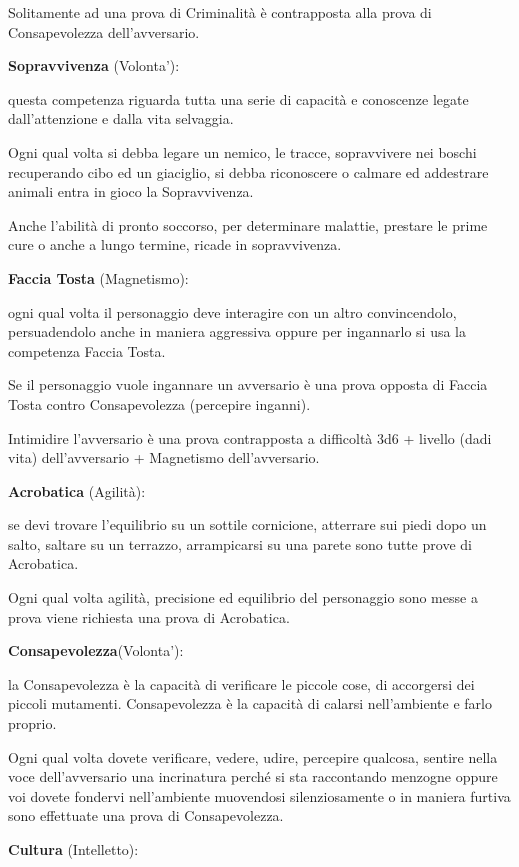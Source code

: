\documentclass[a4paper,11pt,twoside,openany]{book}
\begin{document}
Solitamente ad una prova di Criminalità è contrapposta alla prova di Consapevolezza dell'avversario.

\textbf{Sopravvivenza} (Volonta'):

questa competenza riguarda tutta una serie di capacità e conoscenze legate dall'attenzione e dalla vita selvaggia.

Ogni qual volta si debba legare un nemico, le tracce, sopravvivere nei boschi recuperando cibo ed un giaciglio,  si debba riconoscere o calmare ed addestrare animali entra in gioco la Sopravvivenza.

Anche l'abilità di pronto soccorso, per determinare malattie, prestare le prime cure o anche a lungo termine, ricade in sopravvivenza.

\textbf{Faccia Tosta} (Magnetismo):

ogni qual volta il personaggio deve interagire con un altro convincendolo, persuadendolo anche in maniera aggressiva oppure per ingannarlo si usa la competenza Faccia Tosta.

Se il personaggio vuole ingannare un avversario è una prova opposta di Faccia Tosta contro Consapevolezza (percepire inganni).

Intimidire l'avversario è una prova contrapposta a difficoltà 3d6 + livello (dadi vita) dell'avversario + Magnetismo dell'avversario.

\textbf{Acrobatica} (Agilità):

se devi trovare l'equilibrio su un sottile cornicione, atterrare sui piedi dopo un salto, saltare su un terrazzo, arrampicarsi su una parete sono tutte prove di Acrobatica.

Ogni qual volta agilità, precisione ed equilibrio del personaggio sono messe a prova viene richiesta una prova di Acrobatica.

\textbf{Consapevolezza}(Volonta'):

la Consapevolezza è la capacità di verificare le piccole cose, di accorgersi dei piccoli mutamenti. Consapevolezza è la capacità di calarsi nell'ambiente e farlo proprio.

Ogni qual volta dovete verificare, vedere, udire, percepire qualcosa, sentire nella voce dell'avversario una incrinatura perché si sta raccontando menzogne oppure voi dovete fondervi nell'ambiente muovendosi silenziosamente o in maniera furtiva sono effettuate una prova di Consapevolezza.

\textbf{Cultura} (Intelletto):
\end{document}
